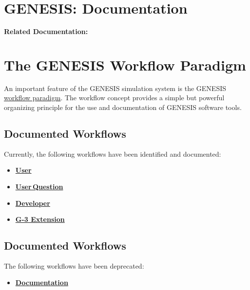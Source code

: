 \documentclass[12pt]{article}
\begin{document}
\section*{GENESIS: Documentation}

{\bf Related Documentation:}

\section*{The GENESIS Workflow Paradigm}

An important feature of the GENESIS simulation system is the GENESIS
\href{http://en.wikipedia.org/wiki/Workflow}{workflow paradigm}. The
workflow concept provides a simple but powerful organizing principle
for the use and documentation of GENESIS software tools.

\subsection*{Documented Workflows}
Currently, the following workflows have been identified and documented:
\begin{itemize}
\item \href{../workflow-user/workflow-user.tex}{\bf User}
\item \href{../workflow-user-query/workflow-user-query.tex}{\bf User\,Question}
\item \href{../workflow-developer/workflow-developer.tex}{\bf Developer}
\item \href{../genesis-extend-functionality/genesis-extend-functionality.tex}{\bf G-3 Extension}
\end{itemize}

\subsection*{Documented Workflows}
The following workflows have been deprecated:
\begin{itemize}
\item \href{../workflow-documentation/workflow-documentation.tex}{\bf Documentation}
\end{itemize}
\end{document}
